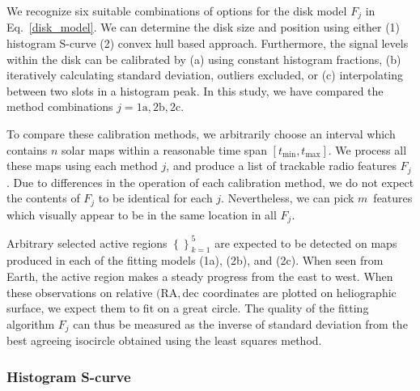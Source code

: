\documentclass{aa}
\newcommand{\s}[2]{{#1}_{\mathrm{#2}}}
\begin{document}
We recognize six suitable combinations of options for the disk model $F_j$ in 
Eq.~\ref{disk_model}. 
We can 
determine the disk size and position using either (1) histogram S-curve (2) convex hull based approach. Furthermore, the 
signal levels within the disk can be calibrated by (a) using constant histogram fractions, (b) iteratively calculating 
standard deviation, outliers excluded, or (c) interpolating between two slots in a histogram peak. In this study, we have compared the method 
combinations $j = \mathrm{1a}, \mathrm{2b}, \mathrm{2c}$.

To compare these calibration methods, we arbitrarily choose an interval which contains $n$ solar maps within a 
reasonable time span $[\s{t}{min},\s{t}{max}]$. We process all these maps using each method $j$, and produce a list of 
trackable radio features $F_j$. Due to differences in the operation of each calibration method, we do not expect the 
contents of $F_j$ to be identical for each $j$. Nevertheless, we can pick $m$ features which visually appear to be in 
the same location in all $F_j$.

Arbitrary selected active regions $\left\{ \right\}_{k=1}^{5}$ are expected to be detected on maps produced in each of 
the fitting models (1a), (2b), and (2c). When seen from Earth, the active region makes a steady progress from 
the east 
to west. When these observations on relative $(\mathrm{RA}, \mathrm{dec}$ coordinates are plotted on heliographic 
surface, we expect them to fit on a great
circle. The quality of the fitting algorithm $F_j$ can thus be measured as the 
inverse of standard deviation from the best agreeing isocircle obtained using the 
least squares method.

\subsubsection{Histogram S-curve}
\end{document}
